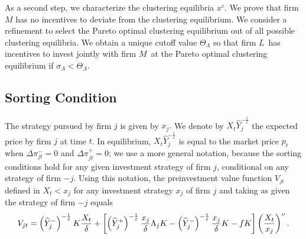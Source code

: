 \documentclass[nogrid,nosurname,sort&compress]{RFS}
\renewcommand\theequation{\arabic{equation}}
\begin{document}
As a second step, we characterize the clustering equilibria $x^{c}$. We prove that firm $M$
has no incentives to deviate from the clustering equilibrium. We consider a refinement to select
the Pareto optimal clustering equilibrium out of all possible clustering equilibria. We obtain a
unique cutoff value $\Theta _{\Lambda }$ so that firm $L$\ has incentives to invest jointly with
firm $M$\ at the Pareto optimal clustering equilibrium if $\sigma _{\Lambda }<\Theta _{\Lambda }$.

\setcounter{section}{1}
\def\thesubsection{B.\arabic{subsection}}
\renewcommand\theequation{B\arabic{equation}}
\subsection{Sorting Condition}

The strategy pursued by firm $j$ is given by $x_{j}.$ We denote by $X_{t}%
\widehat{Y}_{j}^{-\frac{1}{\varepsilon }}$ the expected price by firm $j$ at time $t$. In
equilibrium, $X_{t}\widehat{Y}_{j}^{-\frac{1}{\varepsilon }}$
is equal to the market price $p_{t}$ when $\Delta \pi _{jt}^{-}=0$ and $%
\Delta \pi _{jt}^{+}=0$; we use a more general notation, because the sorting conditions hold for
any given investment strategy of firm $j$, conditional on any strategy of firm $-j$. Using this
notation, the preinvestment value function $V_{jt}$ defined in $X_{t}<x_{j}$ for any investment
strategy $x_{j} $ of firm $j$ and taking as given the strategy of firm $-j$ equals
\begin{align}
V_{jt}=\left( \widehat{Y}_{j}^{-}\right) ^{-\frac{1}{\varepsilon }}K\frac{%
X_{t}}{\delta }+\left[ \left( \widehat{Y}_{j}^{+}\right) ^{-\frac{1}{%
\varepsilon }}\frac{x_{j}}{\delta }\Lambda _{j}K-\left( \widehat{Y}%
_{j}^{-}\right) ^{-\frac{1}{\varepsilon }}\frac{x_{j}}{\delta }K-fK\right] \left(
\text{$\frac{X_{t}}{x_{j}}$}\right) ^{\upsilon }.
\end{align}
\end{document}
